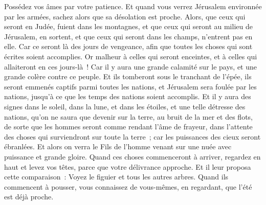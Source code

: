 \begin{multicols}{2}
Possédez vos âmes par votre patience.
Et quand vous verrez Jérusalem environnée par les armées, sachez alors que sa désolation est proche.
Alors, que ceux qui seront en Judée, fuient dans les montagnes, et que ceux qui seront au milieu de Jérusalem, en sortent, et que ceux qui seront dans les champs, n'entrent pas en elle.
Car ce seront là des jours de vengeance, afin que toutes les choses qui sont écrites soient accomplies.
Or malheur à celles qui seront enceintes, et à celles qui allaiteront en ces jours-là~! Car il y aura une grande calamité sur le pays, et une grande colère contre ce peuple.
Et ils tomberont sous le tranchant de l'épée, ils seront emmenés captifs parmi toutes les nations, et Jérusalem sera foulée par les nations, jusqu'à ce que les temps des nations soient accomplis.
Et il y aura des signes dans le soleil, dans la lune, et dans les étoiles, et une telle détresse des nations, qu'on ne saura que devenir sur la terre, au bruit de la mer et des flots,
de sorte que les hommes seront comme rendant l'âme de frayeur, dans l'attente des choses qui surviendront sur toute la terre~; car les puissances des cieux seront ébranlées.
Et alors on verra le Fils de l'homme venant sur une nuée avec puissance et grande gloire.
Quand ces choses commenceront à arriver, regardez en haut et levez vos têtes, parce que votre délivrance approche.
Et il leur proposa cette comparaison~: Voyez le figuier et tous les autres arbres.
Quand ils commencent à pousser, vous connaissez de vous-mêmes, en regardant, que l'été est déjà proche.

\end{multicols}
